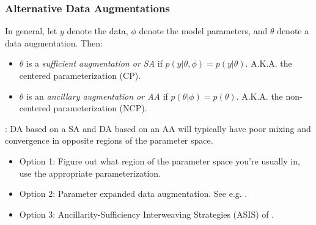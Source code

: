 \documentclass[xcolor=dvipsnames]{beamer}\usepackage{graphicx, color}
\begin{document}
\begin{frame}
  \frametitle{Alternative Data Augmentations}
In general, let $y$ denote the data, $\phi$ denote the model parameters, and $\theta$ denote a data augmentation. Then:

\begin{itemize}
  \item $\theta$ is a {\it \color{red} sufficient augmentation or SA} if $p(y|\theta, \phi) = p(y|\theta)$. A.K.A. the centered parameterization (CP).
  \item $\theta$ is an {\it \color{red} ancillary augmentation or AA} if $p(\theta|\phi) = p(\theta)$. A.K.A. the non-centered parameterization (NCP).
\end{itemize}
\pause

\citet{papaspiliopoulos2007general}: DA based on a SA and DA based on an AA will typically have poor mixing and convergence in opposite regions of the parameter space.\pause
\begin{itemize}
\item Option 1: Figure out what region of the parameter space you're usually in, use the appropriate parameterization.

\item Option 2: Parameter expanded data augmentation. See e.g. \citet{van2001art}.

\item Option 3: Ancillarity-Sufficiency Interweaving Strategies (ASIS) of \citet{yu2011center}.
\end{itemize}
\end{frame}
\end{document}

